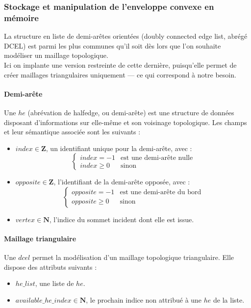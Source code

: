 \documentclass[]{article}
\begin{document}
\subsubsection{Stockage et manipulation de l'enveloppe convexe en mémoire}
La structure en liste de demi-arêtes orientées (doubly connected edge list, abrégé DCEL) est parmi les plus communes qu'il soit dès lors que l'on souhaite modéliser un maillage topologique.\\
Ici on implante une version restreinte de cette dernière, puisqu'elle permet de créer maillages triangulaires uniquement — ce qui correspond à notre besoin.

\paragraph{Demi-arête}
Une $he$ (abrévation de halfedge, ou demi-arête) est une structure de données disposant d'informations sur elle-même et son voisinage topologique. Les champs et leur sémantique associée sont les suivants :
\begin{itemize}
	\item $index \in \mathbf{Z}$, un identifiant unique pour la demi-arête, avec :
	      \[
		      \left\{
		      \begin{array}{ll}
			      index = -1   & \mbox{est une demi-arête nulle} \\
			      index \geq 0 & \mbox{sinon}
		      \end{array}
		      \right.
	      \]
	\item $opposite \in \mathbf{Z}$, l'identifiant de la demi-arête opposée, avec :
	      \[
		      \left\{
		      \begin{array}{ll}
			      opposite = -1   & \text{est une demi-arête du bord} \\
			      opposite \geq 0 & \text{sinon}
		      \end{array}
		      \right.
	      \]
	\item $vertex \in \mathbf{N}$, l'indice du sommet incident dont elle est issue.
\end{itemize}

\paragraph{Maillage triangulaire}
Une $dcel$ permet la modélisation d'un maillage topologique triangulaire. Elle dispose des attributs suivants :
\begin{itemize}
	\item $he\_list$, une liste de $he$.
	\item $available\_he\_index \in \mathbf{N}$, le prochain indice non attribué à une $he$ de la liste.
\end{itemize}
\end{document}
